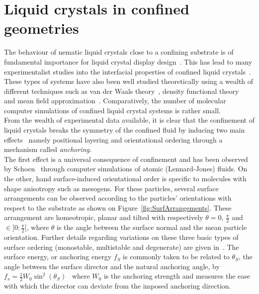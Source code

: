 
\section{Liquid crystals in confined geometries}


The behaviour of nematic liquid crystals close to a confining substrate is of fundamental 
importance for liquid crystal display design~\cite{Shanks82}. This has lead to many
experimentalist studies into the interfacial properties of confined liquid 
crystals~\cite{Jerome93,ZhuangMarucci94}. These types of systems have also been well studied
theoretically using a wealth of different techniques such as van der Waals 
theory~\cite{DelRioTeloDaGamma95}, density functional theory~\cite{Teixeira97,OsipovHess93} and 
mean field approximation~\cite{TjiptoMargoSullivan88}. Comparatively, the number 
of molecular computer simulations of confined liquid crystal systems is rather small.\\

From the wealth of experimental data available, it is clear that the confinement of liquid
crystals breaks the symmetry of the confined fluid by inducing two main effects~\cite{Jerome91} 
namely positional layering and orientational ordering through a mechanism called \emph{anchoring}.\\
The first effect is a universal consequence of confinement and has been observed by
Schoen~\cite{Schoen96,Schoen96a} through computer simulations of atomic (\ie Lennard-Jones)
fluids. On the other, hand surface-induced orientational order is specific to molecules with 
shape anisotropy such as mesogens. For these particles, several surface arrangements can be
observed according to the particles' orientations with respect to the substrate as shown on
Figure~\ref{fig:SurfArrangements}. These arrangement
are homeotropic, planar and tilted  with respectively $\theta = 0$, $\frac{\pi}{2}$ and $\in
]0:\frac{\pi}{2}[$, where $\theta$ is the angle between the surface normal and the mean particle
orientation. Further details regarding variations on these three basic types of surface ordering 
(\ie monostable, multistable and degenerate) are given in~\cite{Jerome91}.
The surface energy, or anchoring energy $f_S$ is commonly taken to be related to $\theta_S$, the
angle between the surface director and the natural anchoring angle, by
$f_s=\frac{1}{2}W_0\sin^2(\theta_S)$~\cite{Jerome91,Allen99}
where $W_0$ is the anchoring strength and measures the ease with which the director
can deviate from the imposed anchoring direction.\\


